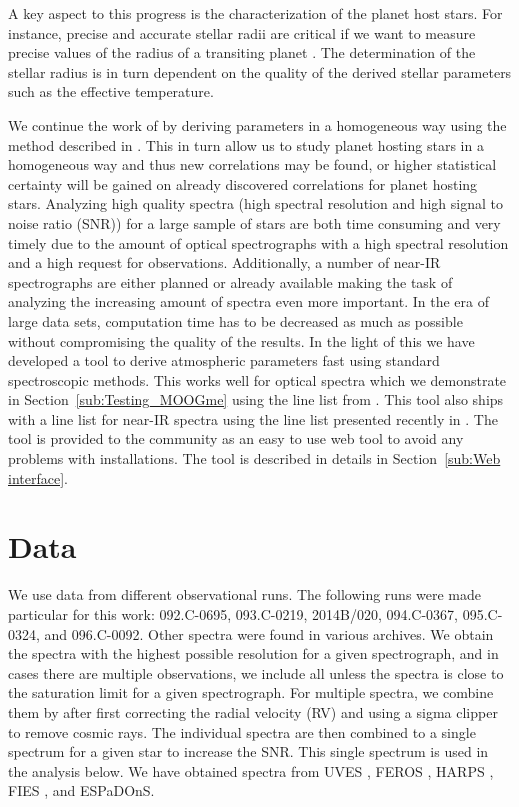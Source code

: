 \documentclass{aa}
\begin{document}
A key aspect to this progress is the characterization of the planet host stars.
For instance, precise and accurate stellar radii are critical if we want to
measure precise values of the radius of a transiting planet
\citep[see e.g.][]{Torres2012}. The determination of the stellar radius
is in turn dependent on the quality of the derived stellar parameters such as
the effective temperature.

We continue the work of \citet{Santos13} by deriving parameters in a
homogeneous way using the method described in \citet{Sousa2011}. This in turn
allow us to study planet hosting stars in a homogeneous way and thus
new correlations may be found, or higher statistical certainty will be
gained on already discovered correlations for planet hosting stars.
Analyzing high quality spectra (high spectral resolution and high signal
to noise ratio (SNR)) for a large sample of stars are both time consuming
and very timely due to the amount of optical spectrographs with a high
spectral resolution and a high request for observations. Additionally,
a number of near-IR spectrographs are either planned or already available
making the task of analyzing the increasing amount of spectra even more
important. In the era of large data sets, computation time has to be decreased
as much as possible without compromising the quality of the results.
In the light of this we have developed a tool to derive atmospheric
parameters fast using standard spectroscopic methods. This works well
for optical spectra which we demonstrate in Section~\ref{sub:Testing_MOOGme}
using the line list from \citet{Sousa2011}. This tool also ships with
a line list for near-IR spectra using the line list presented recently
in \citet{Andreasen2016}. The tool is provided to the community as an
easy to use web tool to avoid any problems with installations. The tool
is described in details in Section~\ref{sub:Web interface}.



\section{Data}
\label{sec:data}
We use data from different observational runs. The following runs were
made particular for this work: 092.C-0695, 093.C-0219, 2014B/020,
094.C-0367, 095.C-0324, and 096.C-0092. Other spectra were found in various
archives. We obtain the spectra with the highest possible resolution
for a given spectrograph, and in cases there are multiple observations,
we include all unless the spectra is close to the saturation limit
for a given spectrograph. For multiple spectra, we combine them by
after first correcting the radial velocity (RV) and using a sigma clipper to
remove cosmic rays. The individual spectra are then combined to a single
spectrum for a given star to increase the SNR. This single spectrum is used
in the analysis below. We have obtained spectra from UVES \citep{UVES},
FEROS \citep{FEROS}, HARPS \citep{HARPS}, FIES \citep{FIES}, and ESPaDOnS.
\end{document}
